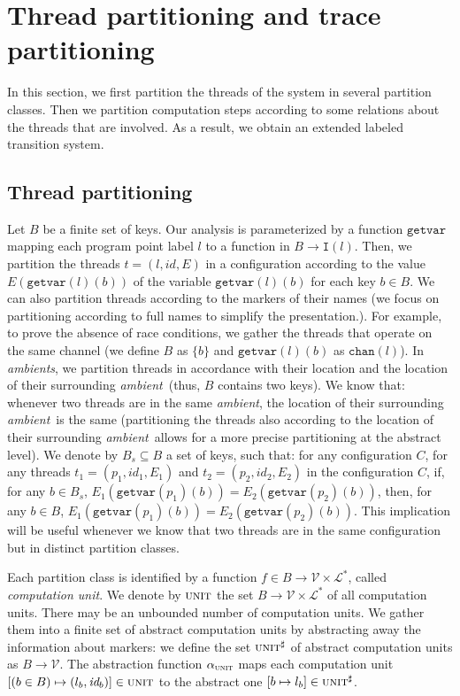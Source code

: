 \documentclass{article}
\newcommand{\ambient}{\emph{ambient}}
\newcommand{\ambients}{\emph{ambients}}
\newcommand{\Names}{\mathcal{V}}
\newcommand{\Labels}{\mathcal{L}}
\newcommand{\interface}{\mathtt{I}}
\newcommand{\Markers}{\Labels^{\ast}}
\newcommand{\canal}{\texttt{chan}}
\newcommand{\piunit}{\alpha_\computationunit}
\newcommand{\computationunit}{\textsc{unit}}
\newcommand{\abstractunit}{\textsc{unit}^{\sharp}}
\newcommand{\giveindex}{\texttt{getvar}}
\begin{document}
\section{Thread partitioning and trace partitioning}
\label{partition class}

In this section, we first partition the threads of the system in several partition classes. Then we partition computation steps according to some relations about the threads that are involved. As a result, we obtain an extended labeled transition system.

\subsection{Thread partitioning}
Let $B$ be a finite set of keys. 
Our analysis is parameterized by  a function $\giveindex$ mapping each program point label $l$ to a function in $B\rightarrow \interface(l)$. 
Then, we partition the threads $t=(l,\textit{id},E)$ in a configuration according to the value $E(\giveindex(l)(b))$ of the variable $\giveindex(l)(b)$ for each key $b\in B$. 
We can also partition threads according to the markers of their names (we focus on partitioning according to full names to simplify the presentation.).
For example, to prove the absence of race conditions, 
we gather the threads that operate on the same channel (we define  $B$ as $\{b\}$ and $\giveindex(l)(b)$ as $\canal(l)$).
In \ambients, we partition threads in accordance with their location and the location of their surrounding \ambient\ (thus, $B$ contains two keys). 
We know that: whenever two threads are in the  same \ambient, the location of their surrounding \ambient\ is the same (partitioning the threads also 
according to the location of their surrounding \ambient\ allows for a more precise  partitioning at the abstract level). 
We denote by $B_s\subseteq B$ a  set of keys, such that:
for any configuration $C$, for any threads $t_1=(p_1,\textit{id}_1,E_1)$ and $t_2=(p_2,\textit{id}_2,E_2)$ in the configuration $C$, if,
for any $b\in B_s$, $E_1(\giveindex(p_1)(b))=E_2(\giveindex(p_2)(b))$, then,  for any $b\in B$, $E_1(\giveindex(p_1)(b))=E_2(\giveindex(p_2)(b))$.
This implication will be useful whenever we know that two threads are in the same configuration but in distinct partition classes.

Each partition class is identified by a function $f\in B\rightarrow \Names\times \Markers$, called \emph{computation unit}.
We denote by $\computationunit$ the set $B\rightarrow \Names\times \Markers$ of all computation units.
There may be an unbounded number of computation units. 
We gather them into a finite set of abstract computation units by abstracting away the information about markers: 
we define the set $\abstractunit$ of abstract computation units as $B\rightarrow \Names$. The abstraction function $\piunit$ maps each computation unit  $[(b\in B)\mapsto (l_b,\textit{id}_b)]\in \computationunit$ to the abstract one $[b\mapsto l_b]\in \abstractunit$.
\end{document}

